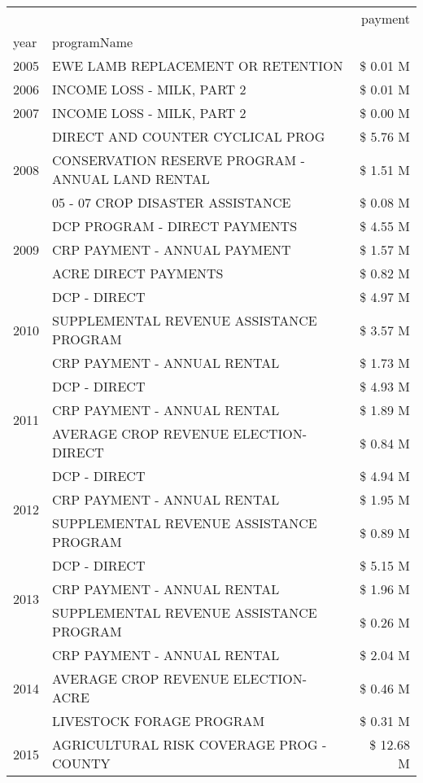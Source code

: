 \begin{tabular}{llr}
\toprule
 &  & payment \\
year & programName &  \\
\midrule
2005 & EWE LAMB REPLACEMENT OR RETENTION & \$ 0.01 M \\
\cline{1-3}
2006 & INCOME LOSS - MILK, PART 2 & \$ 0.01 M \\
\cline{1-3}
2007 & INCOME LOSS - MILK, PART 2 & \$ 0.00 M \\
\cline{1-3}
\multirow[t]{3}{*}{2008} & DIRECT AND COUNTER CYCLICAL PROG & \$ 5.76 M \\
 & CONSERVATION RESERVE PROGRAM - ANNUAL LAND RENTAL & \$ 1.51 M \\
 & 05 - 07 CROP DISASTER ASSISTANCE & \$ 0.08 M \\
\cline{1-3}
\multirow[t]{3}{*}{2009} & DCP PROGRAM - DIRECT PAYMENTS & \$ 4.55 M \\
 & CRP PAYMENT - ANNUAL PAYMENT & \$ 1.57 M \\
 & ACRE DIRECT PAYMENTS & \$ 0.82 M \\
\cline{1-3}
\multirow[t]{3}{*}{2010} & DCP - DIRECT & \$ 4.97 M \\
 & SUPPLEMENTAL REVENUE ASSISTANCE PROGRAM & \$ 3.57 M \\
 & CRP PAYMENT - ANNUAL RENTAL & \$ 1.73 M \\
\cline{1-3}
\multirow[t]{3}{*}{2011} & DCP - DIRECT & \$ 4.93 M \\
 & CRP PAYMENT - ANNUAL RENTAL & \$ 1.89 M \\
 & AVERAGE CROP REVENUE ELECTION-DIRECT & \$ 0.84 M \\
\cline{1-3}
\multirow[t]{3}{*}{2012} & DCP - DIRECT & \$ 4.94 M \\
 & CRP PAYMENT - ANNUAL RENTAL & \$ 1.95 M \\
 & SUPPLEMENTAL REVENUE ASSISTANCE PROGRAM & \$ 0.89 M \\
\cline{1-3}
\multirow[t]{3}{*}{2013} & DCP - DIRECT & \$ 5.15 M \\
 & CRP PAYMENT - ANNUAL RENTAL & \$ 1.96 M \\
 & SUPPLEMENTAL REVENUE ASSISTANCE PROGRAM & \$ 0.26 M \\
\cline{1-3}
\multirow[t]{3}{*}{2014} & CRP PAYMENT - ANNUAL RENTAL & \$ 2.04 M \\
 & AVERAGE CROP REVENUE ELECTION-ACRE & \$ 0.46 M \\
 & LIVESTOCK FORAGE PROGRAM & \$ 0.31 M \\
\cline{1-3}
\multirow[t]{3}{*}{2015} & AGRICULTURAL RISK COVERAGE PROG - COUNTY & \$ 12.68 M \\

\end{tabular}
